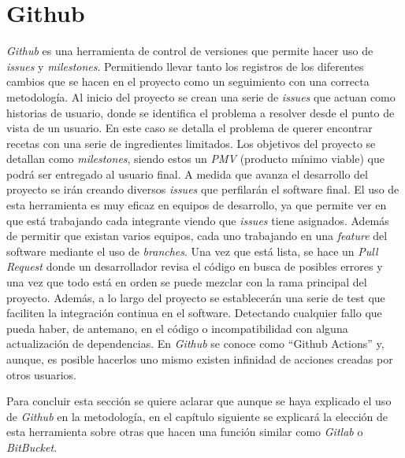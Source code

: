 \section{Github}
\emph{Github} es una herramienta de control de versiones que permite hacer uso de \emph{issues} y \emph{milestones}. Permitiendo llevar tanto los registros de los diferentes cambios que se hacen en el proyecto como un seguimiento con una correcta metodología. Al inicio del proyecto se crean una serie de \emph{issues} que actuan como historias de usuario, donde se identifica el problema a resolver desde el punto de vista de un usuario. En este caso se detalla el problema de querer encontrar recetas con una serie de ingredientes limitados. Los objetivos del proyecto se detallan como \emph{milestones}, siendo estos un \emph{PMV} (producto mínimo viable) que podrá ser entregado al usuario final. A medida que avanza el desarrollo del proyecto se irán creando diversos \emph{issues} que perfilarán el software final. El uso de esta herramienta es muy eficaz en equipos de desarrollo, ya que permite ver en que está trabajando cada integrante viendo que \emph{issues} tiene asignados. Además de permitir que existan varios equipos, cada uno trabajando en una \emph{feature} del software mediante el uso de \emph{branches}. Una vez que está lista, se hace un \emph{Pull Request} donde un desarrollador revisa el código en busca de posibles errores y una vez que todo está en orden se puede mezclar con la rama principal del proyecto. Además, a lo largo del proyecto se establecerán una serie de test que faciliten la integración continua en el software. Detectando cualquier fallo que pueda haber, de antemano, en el código o incompatibilidad con alguna actualización de dependencias. En \emph{Github} se conoce como ``Github Actions'' y, aunque, es posible hacerlos uno mismo existen infinidad de acciones creadas por otros usuarios.

Para concluir esta sección se quiere aclarar que aunque se haya explicado el uso de \emph{Github} en la metodología, en el capítulo siguiente se explicará la elección de esta herramienta sobre otras que hacen una función similar como \emph{Gitlab} o \emph{BitBucket}.